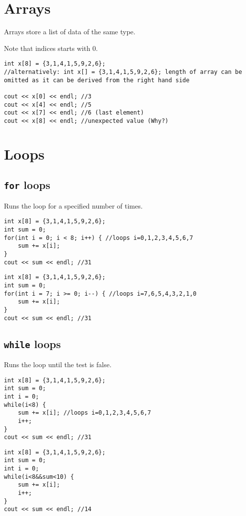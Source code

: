\section{Arrays}
Arrays store a list of data of the same type.

Note that indices starts with 0.

\begin{lstlisting}
int x[8] = {3,1,4,1,5,9,2,6};
//alternatively: int x[] = {3,1,4,1,5,9,2,6}; length of array can be omitted as it can be derived from the right hand side

cout << x[0] << endl; //3 
cout << x[4] << endl; //5
cout << x[7] << endl; //6 (last element)
cout << x[8] << endl; //unexpected value (Why?)
\end{lstlisting}

\section{Loops}
\subsection{\texttt{for} loops}
Runs the loop for a specified number of times.

\begin{lstlisting}
int x[8] = {3,1,4,1,5,9,2,6};
int sum = 0;
for(int i = 0; i < 8; i++) { //loops i=0,1,2,3,4,5,6,7
    sum += x[i];
}
cout << sum << endl; //31
\end{lstlisting}

\begin{lstlisting}
int x[8] = {3,1,4,1,5,9,2,6};
int sum = 0;
for(int i = 7; i >= 0; i--) { //loops i=7,6,5,4,3,2,1,0
    sum += x[i];
}
cout << sum << endl; //31
\end{lstlisting}

\subsection{\texttt{while} loops}
Runs the loop until the test is false.
\begin{lstlisting}
int x[8] = {3,1,4,1,5,9,2,6};
int sum = 0;
int i = 0;
while(i<8) { 
    sum += x[i]; //loops i=0,1,2,3,4,5,6,7
    i++;
}
cout << sum << endl; //31
\end{lstlisting}

\begin{lstlisting}
int x[8] = {3,1,4,1,5,9,2,6};
int sum = 0;
int i = 0;
while(i<8&&sum<10) { 
    sum += x[i];
    i++;
}
cout << sum << endl; //14
\end{lstlisting}

